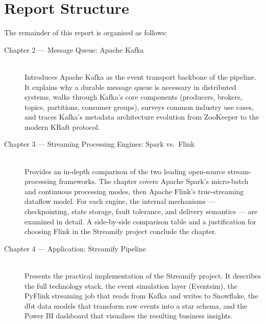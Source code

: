 \section{Report Structure}

The remainder of this report is organised as follows:

\begin{description}
  \item[Chapter 2 — Message Queue: Apache Kafka] \hfill \\
    Introduces Apache Kafka as the event transport backbone of the pipeline.
    It explains why a durable message queue is necessary in distributed systems,
    walks through Kafka's core components (producers, brokers, topics, partitions,
    consumer groups), surveys common industry use cases, and traces Kafka's
    metadata architecture evolution from ZooKeeper to the modern KRaft protocol.

  \item[Chapter 3 — Streaming Processing Engines: Spark vs.\ Flink] \hfill \\
    Provides an in-depth comparison of the two leading open-source stream-processing
    frameworks. The chapter covers Apache Spark's micro-batch and continuous
    processing modes, then Apache Flink's true-streaming dataflow model.
    For each engine, the internal mechanisms — checkpointing, state storage,
    fault tolerance, and delivery semantics — are examined in detail.
    A side-by-side comparison table and a justification for choosing Flink in
    the Streamify project conclude the chapter.

  \item[Chapter 4 — Application: Streamify Pipeline] \hfill \\
    Presents the practical implementation of the Streamify project.
    It describes the full technology stack, the event simulation layer (Eventsim),
    the PyFlink streaming job that reads from Kafka and writes to Snowflake,
    the dbt data models that transform raw events into a star schema, and
    the Power BI dashboard that visualises the resulting business insights.
\end{description}
